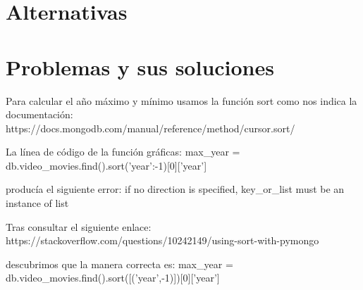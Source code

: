 \documentclass{article}
\begin{document}
\section{Alternativas}

\section{Problemas y sus soluciones}

Para calcular el año máximo y mínimo usamos la función sort como nos indica la documentación:
https://docs.mongodb.com/manual/reference/method/cursor.sort/

La línea de código de la función gráficas:
max_year = db.video_movies.find().sort({'year':-1})[0]['year']

producía el siguiente error:
if no direction is specified, key_or_list must be an instance of list

Tras consultar el siguiente enlace:
https://stackoverflow.com/questions/10242149/using-sort-with-pymongo

descubrimos que la manera correcta es:
max_year = db.video_movies.find().sort([('year',-1)])[0]['year']
\end{document}
